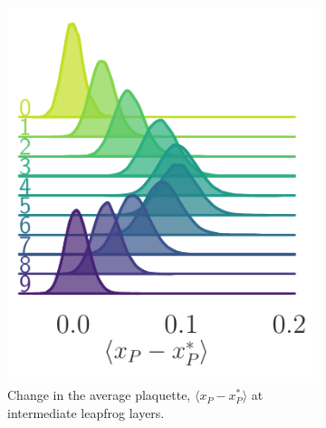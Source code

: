 \documentclass{article} %
\begin{document}
\begin{figure}[htpb]
   \centering
   \begin{subfigure}[h]{0.31\textwidth}
      \includegraphics[width=\textwidth]{figures/ridgeplots/plaqsf_1552.pdf}
      \caption{\label{fig:plaqsf}Change in the average plaquette, \(\langle x_{P}-x_{P}^{*}\rangle\) at intermediate leapfrog layers.}
   \end{subfigure}
   \hfill
   \begin{subfigure}[h]{0.31\textwidth}

\end{subfigure}
\end{figure}
\end{document}
